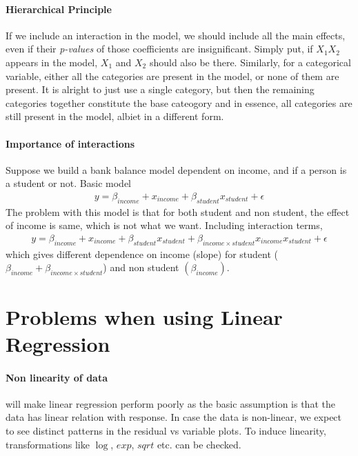 \documentclass[../statistical_learning_notes.tex]{subfiles}
\begin{document}
\paragraph{Hierarchical Principle} If we include an interaction in the model, we should include all the main effects, even if their \emph{p-values} of those coefficients are insignificant. Simply put, if $X_{1}X_{2}$ appears in the model, $X_{1}$ and $X_{2}$ should also be there. Similarly, for a categorical variable, either all the categories are present in the model, or none of them are present. It is alright to just use a single category, but then the remaining categories together constitute the base cateogory and in essence, all categories are still present in the model, albiet in a different form.\newline

\paragraph{Importance of interactions} Suppose we build a bank balance model dependent on income, and if a person is a student or not. Basic model
\begin{align*}
    y = \beta_{income}+x_{income} + \beta_{student}x_{student} + \epsilon
\end{align*}
The problem with this model is that for both student and non student, the effect of income is same, which is not what we want. Including interaction terms,
\begin{align*}
    y = \beta_{income}+x_{income} + \beta_{student}x_{student} + \beta_{income \times student}x_{income}x_{student} + \epsilon
\end{align*}
which gives different dependence on income (slope) for student ($\beta_{income} + \beta_{income \times student}$) and non student $(\beta_{income})$.


\section{Problems when using Linear Regression}
\paragraph{Non linearity of data} will make linear regression perform poorly as the basic assumption is that the data has linear relation with response. In case the data is non-linear, we expect to see distinct patterns in the residual vs variable plots. To induce linearity, transformations like $\log$, $exp$, $sqrt$ etc. can be checked.
\end{document}
